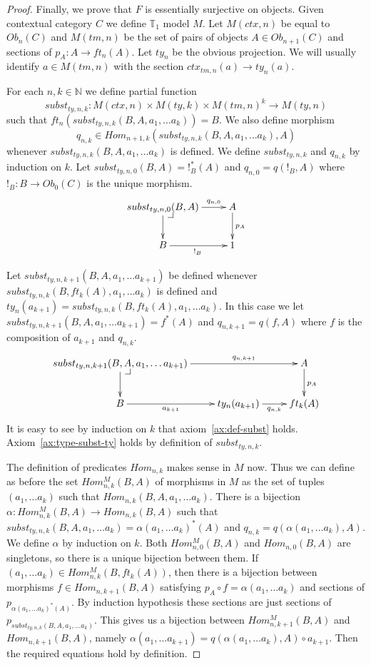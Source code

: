 \documentclass[reqno]{amsart}
\makeatletter
\theoremstyle{definition}
\theoremstyle{remark}
\numberwithin{figure}{section}
\newcommand{\pb}[1][dr]{\save*!/#1-1.2pc/#1:(-1,1)@^{|-}\restore}
\makeatother
\begin{document}
\begin{proof}
Finally, we prove that $F$ is essentially surjective on objects.
Given contextual category $C$ we define $\mathbb{T}_1$ model $M$.
Let $M(ctx,n)$ be equal to $Ob_n(C)$ and $M(tm,n)$ be the set of pairs of objects $A \in Ob_{n+1}(C)$ and sections of $p_A : A \to ft_n(A)$.
Let $ty_n$ be the obvious projection.
We will usually identify $a \in M(tm,n)$ with the section $ctx_{tm,n}(a) \to ty_n(a)$.

For each $n,k \in \mathbb{N}$ we define partial function
\[ subst_{ty,n,k} : M(ctx,n) \times M(ty,k) \times M(tm,n)^k \to M(ty,n) \]
such that $ft_n(subst_{ty,n,k}(B, A, a_1, \ldots a_k)) = B$.
We also define morphism
\[ q_{n,k} \in Hom_{n+1,k}(subst_{ty,n,k}(B, A, a_1, \ldots a_k), A) \]
whenever $subst_{ty,n,k}(B, A, a_1, \ldots a_k)$ is defined.
We define $subst_{ty,n,k}$ and $q_{n,k}$ by induction on $k$.
Let $subst_{ty,n,0}(B,A) = !_B^*(A)$ and $q_{n,0} = q(!_B,A)$ where $!_B : B \to Ob_0(C)$ is the unique morphism.
\[ \xymatrix{ subst_{ty,n,0}(B,A) \ar[r]^-{q_{n,0}} \ar[d] \pb & A \ar[d]^{p_A} \\
              B \ar[r]_{!_B} & 1
            } \]

Let $subst_{ty,n,k+1}(B, A, a_1, \ldots a_{k+1})$ be defined whenever $subst_{ty,n,k}(B, ft_k(A), \allowbreak a_1, \ldots a_k)$ is defined
    and $ty_n(a_{k+1}) = subst_{ty,n,k}(B, ft_k(A), a_1, \ldots a_k)$.
In this case we let $subst_{ty,n,k+1}(B, A, a_1, \ldots a_{k+1}) = f^*(A)$ and $q_{n,k+1} = q(f,A)$ where $f$ is the composition of $a_{k+1}$ and $q_{n,k}$.
\[ \xymatrix{ subst_{ty,n,k+1}(B, A, a_1, \ldots a_{k+1}) \ar[rr]^-{q_{n,k+1}} \ar[d] \pb & & A \ar[d]^{p_A} \\
              B \ar[r]_-{a_{k+1}} & ty_n(a_{k+1}) \ar[r]_-{q_{n,k}} & ft_k(A)
            } \]
It is easy to see by induction on $k$ that axiom~\eqref{ax:def-subst} holds.
Axiom~\eqref{ax:type-subst-ty} holds by definition of $subst_{ty,n,k}$.

The definition of predicates $Hom_{n,k}$ makes sense in $M$ now.
Thus we can define as before the set $Hom^M_{n,k}(B,A)$ of morphisms in $M$ as the set of tuples $(a_1, \ldots a_k)$ such that $Hom_{n,k}(B, A, a_1, \ldots a_k)$.
There is a bijection $\alpha : Hom^M_{n,k}(B,A) \to Hom_{n,k}(B,A)$ such that
    $subst_{ty,n,k}(B, A, a_1, \ldots a_k) = \alpha(a_1, \ldots a_k)^*(A)$ and $q_{n,k} = q(\alpha(a_1, \ldots a_k), A)$.
We define $\alpha$ by induction on $k$.
Both $Hom^M_{n,0}(B,A)$ and $Hom_{n,0}(B,A)$ are singletons, so there is a unique bijection between them.
If $(a_1, \ldots a_k) \in Hom^M_{n,k}(B,ft_k(A))$, then there is a bijection between morphisms $f \in Hom_{n,k+1}(B,A)$
    satisfying $p_A \circ f = \alpha(a_1, \ldots a_k)$ and sections of $p_{\alpha(a_1, \ldots a_k)^*(A)}$.
By induction hypothesis these sections are just sections of $p_{subst_{ty,n,k}(B, A, a_1, \ldots a_k)}$.
This gives us a bijection between $Hom^M_{n,k+1}(B,A)$ and $Hom_{n,k+1}(B,A)$, namely $\alpha(a_1, \ldots a_{k+1}) = q(\alpha(a_1, \ldots a_k), A) \circ a_{k+1}$.
Then the required equations hold by definition.


\end{proof}
\end{document}
